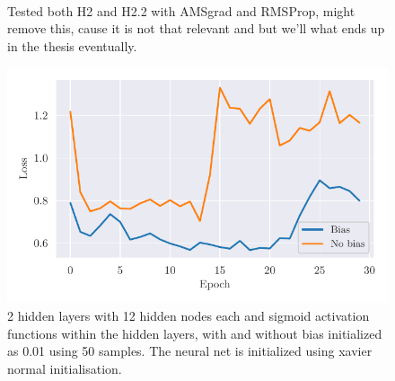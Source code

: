 \documentclass[../main.tex]{subfiles}
\begin{document}
\begin{figure}%
    \centering
    \\
    \caption{Tested both H2 and H2.2 with AMSgrad and RMSProp, might remove this, cause it is not that relevant and but we'll what ends up in the thesis eventually.}%
    \label{fig:lr_exp}%
\end{figure}

\begin{figure}
    \begin{center}
        \includegraphics{figures/bias_12_2_50_samples.pdf}
        \caption{2 hidden layers with 12 hidden nodes each and sigmoid activation functions within the hidden layers, with and without bias initialized as 0.01 using 50 samples. The neural net is initialized using xavier normal initialisation.}
        \label{fig:4}
    \end{center}
\end{figure}
\end{document}
